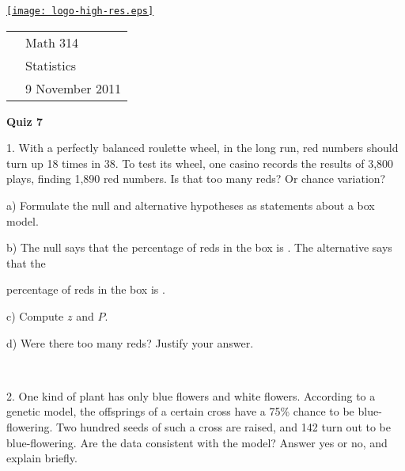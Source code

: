 \documentclass[10pt]{article}
\newcommand{\HH}{\hspace{20pt} \hphantom{a)} }
\begin{document}
\pagestyle{empty}
\lstset{language=R, showspaces=false, showstringspaces=false}

\href{http://www.shepherd.edu}{\texttt{[image: logo-high-res.eps]}}
\vspace{-1.79cm}

{\small
\begin{tabular}{cl}
& Math 314\\
& Statistics\\
\hspace{5.28in} & 9 November 2011
\end{tabular}
}
\setlength{\baselineskip}{1.05\baselineskip}

\begin{center}
\textbf{\large  Quiz 7}
\end{center}

1. With a perfectly balanced roulette wheel, in the long run, 
red numbers should turn up 18 times in 38.
To test its wheel, one casino records the results of 3,800 plays, finding 1,890 red
numbers.  Is that too many reds?  Or chance variation?

\hspace{20pt} a) Formulate the null and alternative hypotheses as 
statements about a box model.
\vspace{1.5in}

\hspace{20pt} b) The null says that the percentage of reds in the box is
\underline{\hspace{30pt}}.  The alternative says that the\vspace{-4pt}

\HH percentage of reds in the box is 
\underline{\hspace{30pt}}.
\bigskip

\hspace{20pt} c) Compute $z$ and $P$.
\vspace{3.5in}

\hspace{20pt} d) Were there too many reds?  Justify your answer.

\vfill
\eject
{\ }

2. One kind of plant has only blue flowers and white flowers.  According to a 
genetic model, the offsprings of a certain cross have a 75\% chance
to be blue-flowering.  Two hundred seeds of such a cross are raised, and
142 turn out to be blue-flowering.  Are the data consistent with the model?  
Answer yes or no, and explain briefly.
\vfill
\eject
\end{document}
